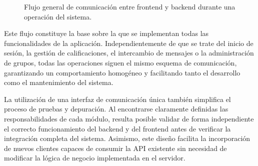 \begin{figure}[H]
\centering
{}
\caption{Flujo general de comunicación entre frontend y backend durante una operación del sistema.}
\label{fig:flujo_general_sistema}
\end{figure}

Este flujo constituye la base sobre la que se implementan todas las funcionalidades de la aplicación. Independientemente de que se trate del inicio de sesión, la gestión de calificaciones, el intercambio de mensajes o la administración de grupos, todas las operaciones siguen el mismo esquema de comunicación, garantizando un comportamiento homogéneo y facilitando tanto el desarrollo como el mantenimiento del sistema.

La utilización de una interfaz de comunicación única también simplifica el proceso de pruebas y depuración. Al encontrarse claramente definidas las responsabilidades de cada módulo, resulta posible validar de forma independiente el correcto funcionamiento del backend y del frontend antes de verificar la integración completa del sistema. Asimismo, este diseño facilita la incorporación de nuevos clientes capaces de consumir la API existente sin necesidad de modificar la lógica de negocio implementada en el servidor.


